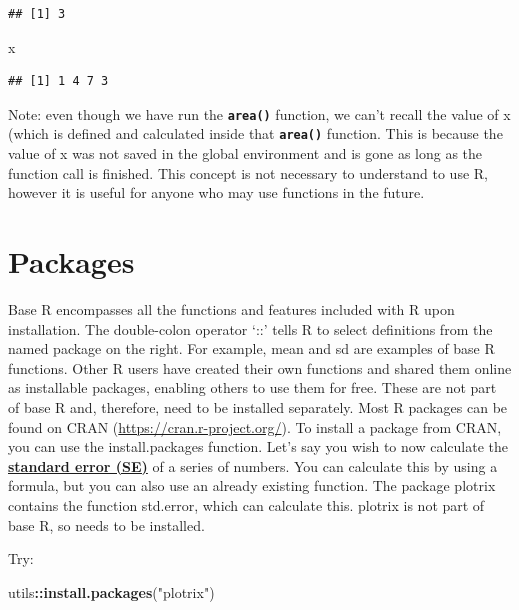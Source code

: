 \documentclass[
]{book}
\newenvironment{Shaded}{\begin{snugshade}}{\end{snugshade}}
\newcommand{\FunctionTok}[1]{\textcolor[rgb]{0.13,0.29,0.53}{\textbf{#1}}}
\newcommand{\NormalTok}[1]{#1}
\newcommand{\SpecialCharTok}[1]{\textcolor[rgb]{0.81,0.36,0.00}{\textbf{#1}}}
\newcommand{\StringTok}[1]{\textcolor[rgb]{0.31,0.60,0.02}{#1}}
\begin{document}
\begin{verbatim}
## [1] 3
\end{verbatim}

\begin{Shaded}
\begin{Highlighting}[]
\NormalTok{x}
\end{Highlighting}
\end{Shaded}

\begin{verbatim}
## [1] 1 4 7 3
\end{verbatim}

Note: even though we have run the \textbf{\texttt{area()}} function, we can't recall the value of x (which is defined and calculated inside that \textbf{\texttt{area()}} function. This is because the value of x was not saved in the global environment and is gone as long as the function call is finished. This concept is not necessary to understand to use R, however it is useful for anyone who may use functions in the future.

\section{Packages}\label{packages}

Base R encompasses all the functions and features included with R upon installation. The double-colon operator `::' tells R to select definitions from the named package on the right. For example, mean and sd are examples of base R functions. Other R users have created their own functions and shared them online as installable packages, enabling others to use them for free. These are not part of base R and, therefore, need to be installed separately. Most R packages can be found on CRAN (\url{https://cran.r-project.org/}). To install a package from CRAN, you can use the install.packages function. Let's say you wish to now calculate the \textbf{\hyperref[acronyms_SE]{standard error (SE)}} of a series of numbers. You can calculate this by using a formula, but you can also use an already existing function. The package plotrix contains the function std.error, which can calculate this. plotrix is not part of base R, so needs to be installed.

Try:

\begin{Shaded}
\begin{Highlighting}[]
\NormalTok{utils}\SpecialCharTok{::}\FunctionTok{install.packages}\NormalTok{(}\StringTok{"plotrix"}\NormalTok{)}
\end{Highlighting}
\end{Shaded}
\end{document}
